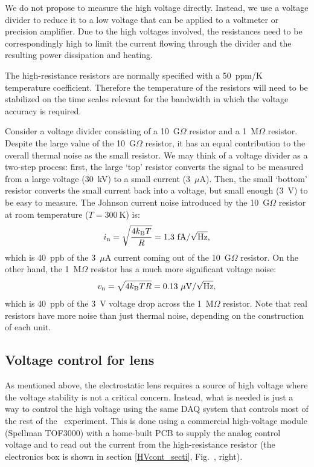We do not propose to measure the high voltage directly. Instead, we use a
voltage divider to reduce it to a low voltage that can be applied to a voltmeter
or precision amplifier. Due to the high voltages involved, the resistances need
to be correspondingly high to limit the current flowing through the divider and
the resulting power dissipation and heating.

The high-resistance resistors are normally specified with a 50~ppm/K temperature
coefficient. Therefore the temperature of the resistors will need to be
stabilized on the time scales relevant for the bandwidth in which the voltage
accuracy is required.

Consider a voltage divider consisting of a 10~G$\Omega$ resistor and a
1~M$\Omega$ resistor. Despite the large value of the 10~G$\Omega$ resistor, it
has an equal contribution to the overall thermal noise as the small resistor. We
may think of a voltage divider as a two-step process: first, the large `top'
resistor converts the signal to be measured from a large voltage (30~kV) to a
small current (3~$\mu$A). Then, the small `bottom' resistor converts the small
current back into a voltage, but small enough (3~V) to be easy to measure. The
Johnson current noise introduced by the 10~G$\Omega$ resistor at room
temperature ($T=300~\text{K}$) is:
%
\[
    i_\text{n}=\sqrt{\frac{4k_\text{B} T}{R}}=1.3~\text{fA}/\sqrt{\text{Hz}},
\]
%
which is 40~ppb of the 3~$\mu$A current coming out of the 10~G$\Omega$ resistor.
On the other hand, the 1~M$\Omega$ resistor has a much more significant voltage
noise:
%
\[
    v_\text{n}=\sqrt{4k_\text{B} TR}=0.13~\mu\text{V}/\sqrt{\text{Hz}},
\]
%
which is 40~ppb of the 3~V voltage drop across the 1~M$\Omega$ resistor. Note
that real resistors have more noise than just thermal noise, depending on the
construction of each unit.

\subsection{Voltage control for lens}

As mentioned above, the electrostatic lens requires a source of high voltage
where the voltage stability is not a critical concern. Instead, what is needed
is just a way to control the high voltage using the same DAQ system that
controls most of the rest of the \CENTREX\ experiment. This is done using a
commercial high-voltage module (Spellman TOF3000) with a home-built PCB to
supply the analog control voltage and to read out the current from the
high-resistance resistor (the electronics box is shown in section
\ref{HVcont_secti}, Fig.~, right).

